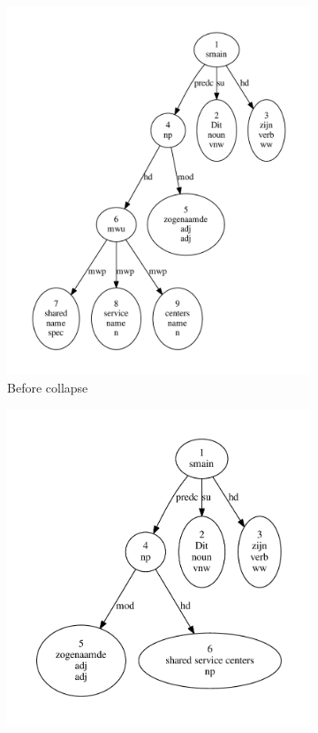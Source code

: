 \begin{figure}[t]
    \begin{subfigure}[t]{0.49\textwidth}
        \centering
        \includegraphics[scale=0.43]{Figures/mwu1.pdf}
        \caption{Before collapse}
    \end{subfigure}
    \begin{subfigure}[t]{0.43\textwidth}
        \centering
        \includegraphics[scale=0.48]{Figures/mwu2.pdf}

\end{subfigure}
\end{figure}
